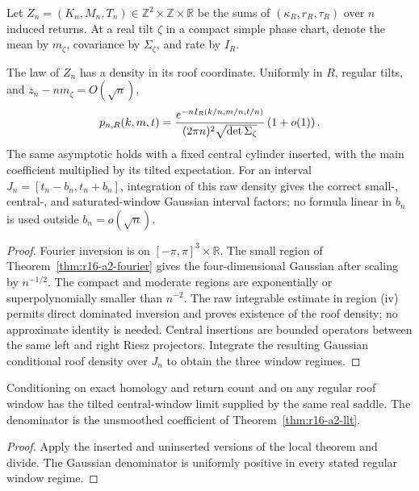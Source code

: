 Let
\(Z_n=(K_n,M_n,T_n)\in\mathbb Z^2\times\mathbb Z\times\mathbb R\)
be the sums of \((\kappa_R,r_R,\tau_R)\) over \(n\) induced returns.  At a
real tilt \(\zeta\) in a compact simple phase chart, denote the mean by
\(m_\zeta\), covariance by \(\Sigma_\zeta\), and rate by \(I_R\).

\begin{theorem}
\label{thm:r16-a2-llt}
The law of \(Z_n\) has a density in its roof coordinate.  Uniformly in \(R\),
regular tilts, and \(z_n-nm_\zeta=O(\sqrt n)\),
\[
 p_{n,R}(k,m,t)
 ={e^{-nI_R(k/n,m/n,t/n)}\over
   (2\pi n)^2\sqrt{\det\Sigma_\zeta}}
 \left(1+o(1)\right).
\]
The same asymptotic holds with a fixed central cylinder inserted, with the
main coefficient multiplied by its tilted expectation.  For an interval
\(J_n=[t_n-b_n,t_n+b_n]\), integration of this raw density gives the correct
small-, central-, and saturated-window Gaussian interval factors; no formula
linear in \(b_n\) is used outside \(b_n=o(\sqrt n)\).
\end{theorem}

\begin{proof}
Fourier inversion is on
\([ -\pi,\pi]^3\times\mathbb R\).  The small region of
Theorem~\ref{thm:r16-a2-fourier} gives the four-dimensional Gaussian after
scaling by \(n^{-1/2}\).  The compact and moderate regions are exponentially
or superpolynomially smaller than \(n^{-2}\).  The raw integrable estimate in
region (iv) permits direct dominated inversion and proves existence of the
roof density; no approximate identity is needed.  Central insertions are
bounded operators between the same left and right Riesz projectors.  Integrate
the resulting Gaussian conditional roof density over \(J_n\) to obtain the
three window regimes.
\end{proof}

\begin{corollary}
\label{cor:r16-a2-conditioning}
Conditioning on exact homology and return count and on any regular roof window
has the tilted central-window limit supplied by the same real saddle.  The
denominator is the unsmoothed coefficient of
Theorem~\ref{thm:r16-a2-llt}.
\end{corollary}

\begin{proof}
Apply the inserted and uninserted versions of the local theorem and divide.
The Gaussian denominator is uniformly positive in every stated regular
window regime.
\end{proof}

